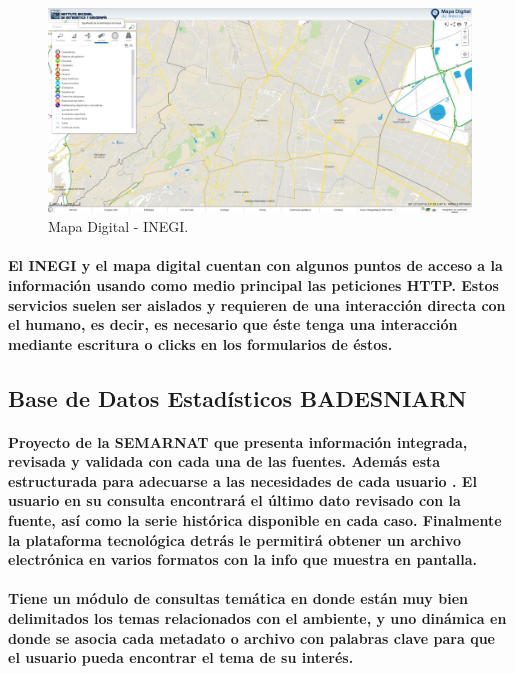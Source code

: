   \begin{figure}[h!]
      \centering
        \includegraphics[width=\textwidth]{./images/MapaDigital.png}
      \caption{Mapa Digital - INEGI.}
  \end{figure}

  \paragraph{El INEGI y el mapa digital cuentan con algunos puntos de acceso a la información usando como medio principal las peticiones HTTP. Estos servicios suelen ser aislados y requieren de una interacción directa con el humano, es decir, es necesario que éste tenga una interacción mediante escritura o clicks en los formularios de éstos.}

  \subsection {Base de Datos Estadísticos BADESNIARN}
    \paragraph {Proyecto de la SEMARNAT que presenta información integrada, revisada y validada con cada una de las fuentes. Además esta estructurada para adecuarse a las necesidades de cada usuario . El usuario en su consulta encontrará el último dato revisado con la fuente, así como la serie histórica disponible en cada caso. Finalmente la plataforma tecnológica detrás le permitirá obtener un archivo electrónica en varios formatos con la info que muestra en pantalla.}    

    \paragraph { Tiene un módulo de consultas temática en donde están muy bien delimitados los temas relacionados con el ambiente, y uno dinámica en donde se asocia cada metadato o archivo con palabras clave para que el usuario pueda encontrar el tema de su interés. \cite{17}}

